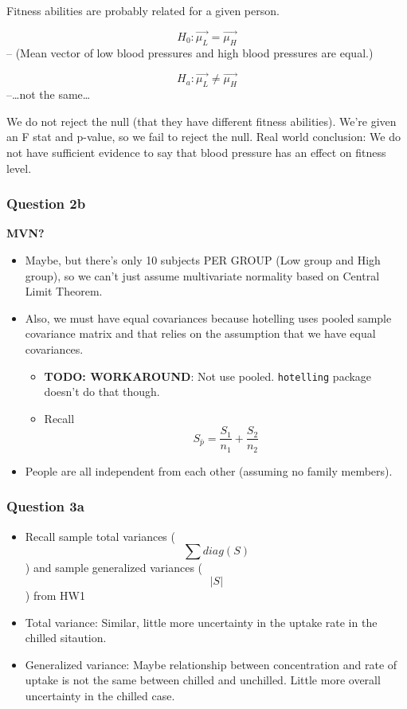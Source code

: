 \documentclass[]{article}
\providecommand{\tightlist}{%
  \setlength{\itemsep}{0pt}\setlength{\parskip}{0pt}}
\begin{document}
Fitness abilities are probably related for a given person.

\[H_0: \vec{\mu_L} = \vec{\mu_H}\] -- (Mean vector of low blood
pressures and high blood pressures are equal.)

\[H_a: \vec{\mu_L} \ne \vec{\mu_H}\] --\ldots{}not the same\ldots{}

We do not reject the null (that they have different fitness abilities).
We're given an F stat and p-value, so we fail to reject the null. Real
world conclusion: We do not have sufficient evidence to say that blood
pressure has an effect on fitness level.

\hypertarget{question-2b}{%
\subsubsection{Question 2b}\label{question-2b}}

\textbf{MVN?}

\begin{itemize}
\tightlist
\item
  Maybe, but there's only 10 subjects PER GROUP (Low group and High
  group), so we can't just assume multivariate normality based on
  Central Limit Theorem.
\item
  Also, we must have equal covariances because hotelling uses pooled
  sample covariance matrix and that relies on the assumption that we
  have equal covariances.

  \begin{itemize}
  \tightlist
  \item
    \textbf{TODO: WORKAROUND}: Not use pooled. \texttt{hotelling}
    package doesn't do that though.
  \item
    Recall \[ S_{\bar{p}} = \frac{S_1}{n_1} + \frac{S_2}{n_2} \]
  \end{itemize}
\item
  People are all independent from each other (assuming no family
  members).
\end{itemize}

\hypertarget{question-3a}{%
\subsubsection{Question 3a}\label{question-3a}}

\begin{itemize}
\tightlist
\item
  Recall sample total variances (\[ \sum diag(S) \]) and sample
  generalized variances (\[ | S |\]) from HW1
\item
  Total variance: Similar, little more uncertainty in the uptake rate in
  the chilled sitaution.
\item
  Generalized variance: Maybe relationship between concentration and
  rate of uptake is not the same between chilled and unchilled. Little
  more overall uncertainty in the chilled case.
\end{itemize}
\end{document}
